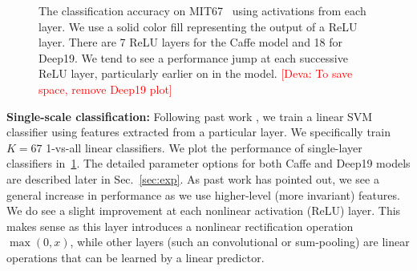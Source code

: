\documentclass[10pt,twocolumn,letterpaper]{article}
\newcommand{\deva}[1]{\textcolor{red}{[Deva: #1]}}
\begin{document}
\begin{figure}[t!]
\centering
\caption{The classification accuracy on MIT67~\cite{MIT67} using activations from each layer. We use a solid color fill representing the output of a ReLU layer. There are 7 ReLU layers for the Caffe model and 18 for Deep19. We tend to see a performance jump at each successive ReLU layer, particularly earlier on in the model. \deva{To save space, remove Deep19 plot}}
\label{fig:layer_MIT67}
\end{figure}

{\bf Single-scale classification:} Following past work \cite{cnn_baseline}, we train a linear SVM classifier using features extracted from a particular layer. We specifically train $K=67$ 1-vs-all linear classifiers.
We plot the performance of single-layer classifiers in~\ref{fig:layer_MIT67}. The detailed parameter options for both Caffe and Deep19 models are described later in Sec.~\ref{sec:exp}. As past work has pointed out, we see a general increase in performance as we use higher-level (more invariant) features. We do see a slight improvement at each nonlinear activation (ReLU) layer. This makes sense as this layer introduces a nonlinear rectification operation $\max(0,x)$, while other layers (such an convolutional or sum-pooling) are linear operations that can be learned by a linear predictor.
\end{document}
